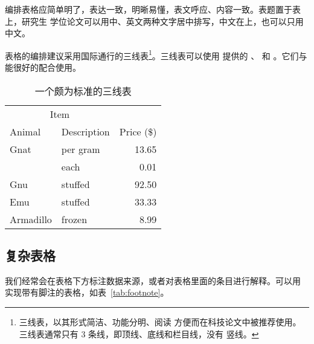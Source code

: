 \documentclass{sjtureport}
\begin{document}
编排表格应简单明了，表达一致，明晰易懂，表文呼应、内容一致。表题置于表上，研究生
学位论文可以用中、英文两种文字居中排写，中文在上，也可以只用中文。

表格的编排建议采用国际通行的三线表\footnote{三线表，以其形式简洁、功能分明、阅读
方便而在科技论文中被推荐使用。三线表通常只有 3 条线，即顶线、底线和栏目线，没有
竖线。}。三线表可以使用  提供的 、 和
。它们与  能很好的配合使用。

\begin{table}[!hpt]
	\caption[一个颇为标准的三线表]{一个颇为标准的三线表\footnotemark}
	\label{tab:firstone}
	\centering
	\begin{tabular}{@{}llr@{}} \toprule
	\multicolumn{2}{c}{Item} \\ \cmidrule(r){1-2}
	Animal & Description & Price (\$)\\ \midrule
	Gnat& per gram& 13.65 \\
			& each& 0.01 \\
	Gnu & stuffed & 92.50 \\
	Emu & stuffed & 33.33 \\
	Armadillo & frozen & 8.99 \\ \bottomrule
	\end{tabular}
\end{table}

\subsection{复杂表格}

我们经常会在表格下方标注数据来源，或者对表格里面的条目进行解释。可以用
 实现带有脚注的表格，如表~\ref{tab:footnote}。
\end{document}
